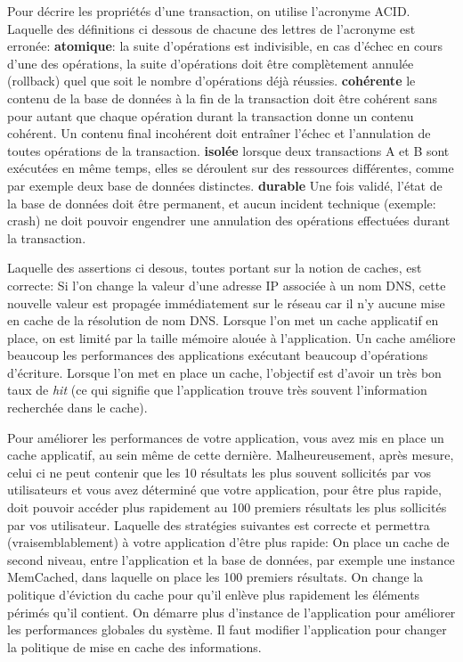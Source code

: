 \documentclass[a4paper,10pt]{article}
\begin{document}
\begin{question}{Pour décrire les propriétés d'une transaction, on utilise l'acronyme ACID. Laquelle
des définitions ci dessous de chacune des lettres de l'acronyme est erronée:}
  \true \textbf{atomique}: la suite d'opérations est indivisible, en cas d'échec en cours
  d'une des opérations, la suite d'opérations doit être complètement annulée (rollback) quel que
  soit le nombre d'opérations déjà réussies.
  \true \textbf{cohérente} le contenu de la base de données à la fin de la transaction doit être
  cohérent sans pour autant que chaque opération durant la transaction donne un contenu cohérent.
  Un contenu final incohérent doit entraîner l'échec et l'annulation de toutes opérations de la
  transaction.
  \false \textbf{isolée} lorsque deux transactions A et B sont exécutées en même temps, elles se
  déroulent sur des ressources différentes, comme par exemple deux base de données distinctes.
  \true \textbf{durable} Une fois validé, l'état de la base de données doit être permanent, et aucun
  incident technique (exemple: crash) ne doit pouvoir engendrer une annulation des opérations
  effectuées durant la transaction.
\end{question}

\begin{question}{Laquelle des assertions ci desous, toutes portant sur la notion de caches, est
correcte:}
  \false Si l'on change la valeur d'une adresse IP associée à un nom DNS, cette nouvelle valeur est
  propagée immédiatement sur le réseau car il n'y aucune mise en cache de la résolution de nom DNS.
  \false Lorsque l'on met un cache applicatif en place, on est limité par la taille mémoire alouée
  à l'application. %
  \false Un cache améliore beaucoup les performances des applications exécutant beaucoup
  d'opérations d'écriture.
  \true Lorsque l'on met en place un cache, l'objectif est d'avoir un très bon taux de \textit{hit}
  (ce qui signifie que l'application trouve très souvent l'information recherchée dans le cache).
\end{question}

\begin{question}{Pour améliorer les performances de votre application, vous avez mis en place un
cache applicatif, au sein même de cette dernière. Malheureusement, après mesure, celui ci ne peut
contenir que les 10 résultats les plus souvent sollicités par vos utilisateurs et vous avez
déterminé que votre application, pour être plus rapide, doit pouvoir accéder plus rapidement au 100
premiers résultats les plus sollicités par vos utilisateur. Laquelle des stratégies suivantes est
correcte et permettra (vraisemblablement) à votre application d'être plus rapide:}
  \true On place un cache de second niveau, entre l'application et la base de données, par exemple
  une instance MemCached, dans laquelle on place les 100 premiers résultats.
  \false On change la politique d'éviction du cache pour qu'il enlève plus rapidement les éléments
  périmés qu'il contient.
  \false On démarre plus d'instance de l'application pour améliorer les performances globales du
  système.
  \false Il faut modifier l'application pour changer la politique de mise en cache des informations.
\end{question}
\end{document}
